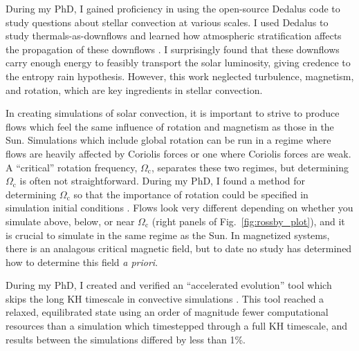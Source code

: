 \documentclass[aps, pre, onecolumn, nofootinbib, notitlepage, groupedaddress, amsfonts, amssymb, amsmath]{revtex4-1}
\begin{document}
During my PhD, I gained proficiency in using the open-source Dedalus \citep{burns&all2019} code to study questions about stellar convection at various scales.
I used Dedalus to study thermals-as-downflows and learned how atmospheric stratification affects the propagation of these downflows \citep{andersLB2019}.
I surprisingly found that these downflows carry enough energy to feasibly transport the solar luminosity, giving credence to the entropy rain hypothesis.
However, this work neglected turbulence, magnetism, and rotation, which are key ingredients in stellar convection.

In creating simulations of solar convection, it is important to strive to produce flows which feel the same influence of rotation and magnetism as those in the Sun.
Simulations which include global rotation can be run in a regime where flows are heavily affected by Coriolis forces or one where Coriolis forces are weak.
A ``critical'' rotation frequency, $\Omega_\text{c}$, separates these two regimes, but determining $\Omega_\text{c}$ is often not straightforward.
During my PhD, I found a method for determining $\Omega_\text{c}$ so that the importance of rotation could be specified in simulation initial conditions \citep[see left panel of Fig. \ref{fig:rossby_plot} and][]{anders&all2019}.
Flows look very different depending on whether you simulate above, below, or near $\Omega_\text{c}$ (right panels of Fig.~\ref{fig:rossby_plot}), and it is crucial to simulate in the same regime as the Sun.
In magnetized systems, there is an analagous critical magnetic field, but to date no study has determined how to determine this field \emph{a priori}.

During my PhD, I created and verified an ``accelerated evolution'' tool which skips the long KH timescale in convective simulations \citep{anders&all2018}.
This tool reached a relaxed, equilibrated state using an order of magnitude fewer computational resources than a simulation which timestepped through a full KH timescale, and results between the simulations differed by less than 1\%.



\end{document}
